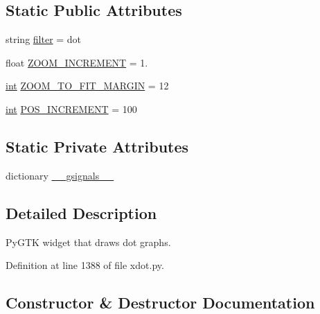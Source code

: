 \subsection*{Static Public Attributes}
\begin{DoxyCompactItemize}
\item 
string \hyperlink{classsmacc__viewer_1_1xdot_1_1xdot_1_1DotWidget_ad0407b9aa639144d8681497d2b643705}{filter} = \textquotesingle{}dot\textquotesingle{}
\item 
float \hyperlink{classsmacc__viewer_1_1xdot_1_1xdot_1_1DotWidget_a1c0d2875d33064ba8d476e8142b05a0f}{Z\+O\+O\+M\+\_\+\+I\+N\+C\+R\+E\+M\+E\+NT} = 1.
\item 
\hyperlink{classint}{int} \hyperlink{classsmacc__viewer_1_1xdot_1_1xdot_1_1DotWidget_a2b9e2bf1dbf6eb9fa2311e8762387606}{Z\+O\+O\+M\+\_\+\+T\+O\+\_\+\+F\+I\+T\+\_\+\+M\+A\+R\+G\+IN} = 12
\item 
\hyperlink{classint}{int} \hyperlink{classsmacc__viewer_1_1xdot_1_1xdot_1_1DotWidget_aab5f33a81f2c7339690f161f6f811577}{P\+O\+S\+\_\+\+I\+N\+C\+R\+E\+M\+E\+NT} = 100
\end{DoxyCompactItemize}
\subsection*{Static Private Attributes}
\begin{DoxyCompactItemize}
\item 
dictionary \hyperlink{classsmacc__viewer_1_1xdot_1_1xdot_1_1DotWidget_acef661de0111eae10dd92d82ea229cfd}{\+\_\+\+\_\+gsignals\+\_\+\+\_\+}
\end{DoxyCompactItemize}


\subsection{Detailed Description}
\begin{DoxyVerb}PyGTK widget that draws dot graphs.\end{DoxyVerb}
 

Definition at line 1388 of file xdot.\+py.



\subsection{Constructor \& Destructor Documentation}
